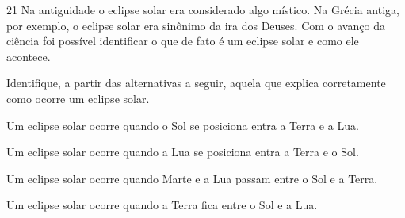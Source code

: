 \num{21}
  Na antiguidade o eclipse solar era considerado algo místico. Na Grécia
  antiga, por exemplo, o eclipse solar era sinônimo da ira dos Deuses.
  Com o avanço da ciência foi possível identificar o que de fato é um
  eclipse solar e como ele acontece.


Identifique, a partir das alternativas a seguir, aquela que explica
corretamente como ocorre um eclipse solar.

\begin{escolha}
\item
  Um eclipse solar ocorre quando o Sol se posiciona entra a Terra e a Lua.
\item
  Um eclipse solar ocorre quando a Lua se posiciona entra a Terra e o Sol.
\item
  Um eclipse solar ocorre quando Marte e a Lua passam entre o Sol e a Terra.
\item
  Um eclipse solar ocorre quando a Terra fica entre o Sol e a Lua.
\end{escolha}

